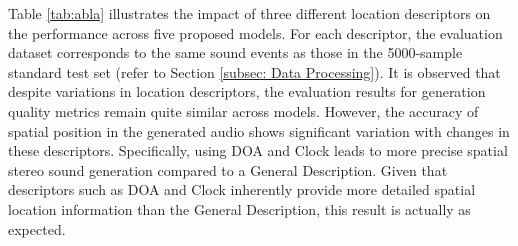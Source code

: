 \documentclass{IEEEtran}
\begin{document}

Table \ref{tab:abla} illustrates the impact of three different location descriptors on the performance across five proposed models. For each descriptor, the evaluation dataset corresponds to the same sound events as those in the 5000-sample standard test set (refer to Section \ref{subsec: Data Processing}). It is observed that despite variations in location descriptors, the evaluation results for generation quality metrics remain quite similar across models. However, the accuracy of spatial position in the generated audio shows significant variation with changes in these descriptors. Specifically, using DOA and Clock leads to more precise spatial stereo sound generation compared to a General Description. Given that descriptors such as DOA and Clock inherently provide more detailed spatial location information than the General Description, this result is actually as expected.
\end{document}
